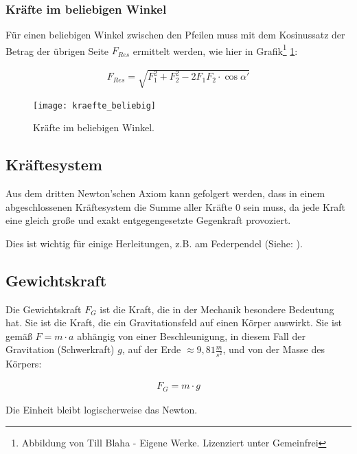 \subsubsection{Kräfte im beliebigen Winkel}

\noindent Für einen beliebigen Winkel zwischen den Pfeilen muss mit dem Kosinussatz der Betrag der übrigen Seite $F_{Res}$ ermittelt werden, wie hier in Grafik\footnote{Abbildung von Till Blaha - Eigene Werke. Lizenziert unter Gemeinfrei} \ref{fig:kraefte_beliebig}:

\begin{align}
	F_{Res} = \sqrt{F_1^2 + F_2^2 - 2F_1 F_2 \cdot \cos{\alpha '}}
\end{align}

\begin{figure}[h!]
	\centering
	\texttt{[image: kraefte\_beliebig]}
	\caption{Kräfte im beliebigen Winkel.}
	\label{fig:kraefte_beliebig}
\end{figure}




\subsection{Kräftesystem}

Aus dem dritten Newton'schen Axiom kann gefolgert werden, dass in einem abgeschlossenen Kräftesystem die Summe aller Kräfte $0$ sein muss, da jede Kraft eine gleich große und exakt entgegengesetzte Gegenkraft provoziert.

Dies ist wichtig für einige Herleitungen, z.B. am Federpendel (Siehe: ).


\subsection{Gewichtskraft} \label{subsec:Gewichtskraft}

Die Gewichtskraft $F_{G}$ ist die Kraft, die in der Mechanik besondere Bedeutung hat. Sie ist die Kraft, die ein Gravitationsfeld auf einen Körper auswirkt. Sie ist gemäß $F = m \cdot a$ abhängig von einer Beschleunigung, in diesem Fall der Gravitation (Schwerkraft) $g$, auf der Erde $\approx 9,81 \frac{m}{s^2}$, und von der Masse des Körpers:

\begin{align}
	F_{G} = m \cdot g
\end{align}

\noindent Die Einheit bleibt logischerweise das Newton.